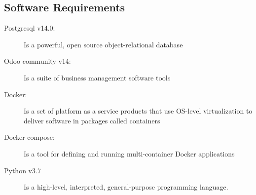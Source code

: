 \subsection{Software Requirements}

\begin{description}
	\item[Postgresql v14.0:] Is a powerful, open source object-relational database
	\item[Odoo community v14:] Is a suite of business management software tools
	\item[Docker:] Is a set of platform as a service products that use OS-level virtualization to deliver software in packages called containers
	\item[Docker compose:] Is a tool for defining and running multi-container Docker applications
	\item[Python v3.7] Is a high-level, interpreted, general-purpose programming language.
\end{description}








